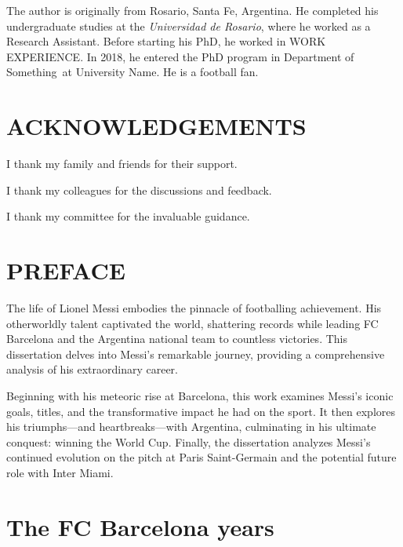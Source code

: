 \documentclass{report}
\newcommand{\university}{University Name}
\newcommand{\department}{Department of Something}
\begin{document}
The author is originally from Rosario, Santa Fe, Argentina.
He completed his undergraduate studies at the \textit{Universidad de Rosario},
where he worked as a Research Assistant.
Before starting his PhD, he worked in WORK EXPERIENCE.
In 2018, he entered the PhD program in \department\ at \university.
He is a football fan.

\chapter*{ACKNOWLEDGEMENTS}

I thank my family and friends for their support.

I thank my colleagues for the discussions and feedback.

I thank my committee for the invaluable guidance.

\chapter*{PREFACE}

The life of Lionel Messi embodies the pinnacle of footballing achievement. 
His otherworldly talent captivated the world, shattering records while leading 
FC Barcelona and the Argentina national team to countless victories.
This dissertation delves into Messi's remarkable journey, providing a 
comprehensive analysis of his extraordinary career.

Beginning with his meteoric rise at Barcelona, this work examines Messi's 
iconic goals, titles, and the transformative impact he had on the sport.
It then explores his triumphs---and heartbreaks---with Argentina, culminating in 
his ultimate conquest: winning the World Cup.
Finally, the dissertation analyzes Messi's continued evolution on the pitch 
at Paris Saint-Germain and the potential future role with Inter Miami.

\setcounter{tocdepth}{1} %

\tableofcontents
\listoftables
\listoffigures


\clearpage

\setcounter{page}{1}
\doublespacing

\setcounter{section}{0}%

\chapter{The FC Barcelona years}
\end{document}
